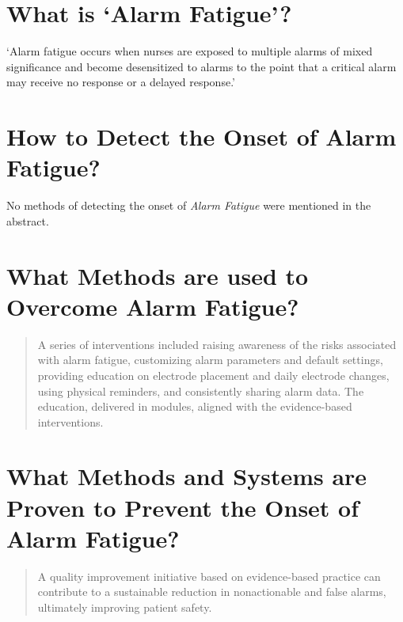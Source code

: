 \section{What is `Alarm Fatigue'?}

`Alarm fatigue occurs when nurses are exposed to multiple alarms of mixed significance and become desensitized to alarms to the point that a critical alarm may receive no response or a delayed response.'

\section{How to Detect the Onset of Alarm Fatigue?}

No methods of detecting the onset of \textit{Alarm Fatigue} were mentioned in the abstract.

\section{What Methods are used to Overcome Alarm Fatigue?}

\begin{quotation}
	A series of interventions included raising awareness of the risks associated with alarm fatigue, customizing alarm parameters and default settings, providing education on electrode placement and daily electrode changes, using physical reminders, and consistently sharing alarm data. The education, delivered in modules, aligned with the evidence-based interventions.
\end{quotation}

\section{What Methods and Systems are Proven to Prevent the Onset of Alarm Fatigue?}

\begin{quotation}
	A quality improvement initiative based on evidence-based practice can contribute to a sustainable reduction in nonactionable and false alarms, ultimately improving patient safety.
\end{quotation}


